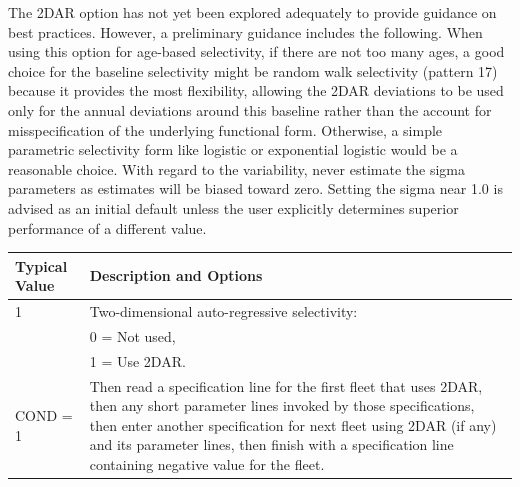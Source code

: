 The 2DAR option has not yet been explored adequately to provide guidance on best practices. However, a preliminary guidance includes the following. When using this option for age-based selectivity, if there are not too many ages, a good choice for the baseline selectivity might be random walk selectivity (pattern 17) because it provides the most flexibility, allowing the 2DAR deviations to be used only for the annual deviations around this baseline rather than the account for misspecification of the underlying functional form. Otherwise, a simple parametric selectivity form like logistic or exponential logistic would be a reasonable choice. With regard to the variability, never estimate the sigma parameters as estimates will be biased toward zero. Setting the sigma near 1.0 is advised as an initial default unless the user explicitly determines superior performance of a different value.

\begin{tabular}{p{2cm} p{14cm}}
	\hline
	Typical Value & Description and Options \Tstrut\Bstrut\\
	\hline
	1 \Tstrut & Two-dimensional auto-regressive selectivity: \\
	  & 0 = Not used, \\
	  & 1 = Use 2DAR. \\
	COND = 1 & Then read a specification line for the first fleet that uses 2DAR, then any short parameter lines invoked by those specifications, then enter another specification for next fleet using 2DAR (if any) and its parameter lines, then finish with a specification line containing negative value for the fleet. \Bstrut\\
	\hline
\end{tabular}

